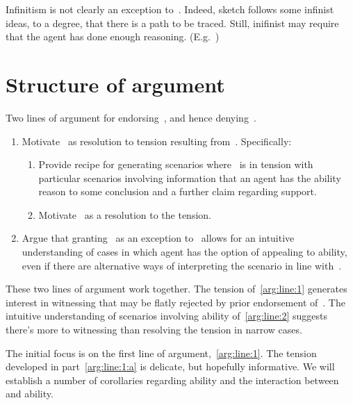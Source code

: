 \begin{note}
  Infinitism is not clearly an exception to~\uRa{}.
  Indeed, sketch follows some infinist ideas, to a degree, that there is a path to be traced.
  Still, inifinist may require that the agent has done enough reasoning.
  (E.g.\ \textcite[10]{Klein:2007ve})
\end{note}

\newpage

\section{Structure of argument}
\label{sec:structure-argument}

\begin{note}
  Two lines of argument for endorsing~\rC{}, and hence denying~\uRa{}.
  \begin{enumerate}[label=(L\arabic*), ref=(L\arabic*)]
  \item\label{arg:line:1} Motivate~\rC{} as resolution to tension resulting from~\uRa{}.\newline
    Specifically:
    \begin{enumerate}[label=(L1\alph*)]
    \item\label{arg:line:1:a} Provide recipe for generating scenarios where~\uRa{} is in tension with particular scenarios involving information that an agent has the ability reason to some conclusion and a further claim regarding support.
    \item\label{arg:line:1:b} Motivate~\rC{} as a resolution to the tension.
    \end{enumerate}
  \item\label{arg:line:2} Argue that granting~\rC{} as an exception to~\uRa{} allows for an intuitive understanding of cases in which agent has the option of appealing to ability, even if there are alternative ways of interpreting the scenario in line with~\uRa{}.
  \end{enumerate}
  These two lines of argument work together.
  The tension of~\ref{arg:line:1} generates interest in witnessing that may be flatly rejected by prior endorsement of~\uRa{}.
  The intuitive understanding of scenarios involving ability of~\ref{arg:line:2} suggests there's more to witnessing than resolving the tension in narrow cases.
\end{note}

\begin{note}
  The initial focus is on the first line of argument,~\ref{arg:line:1}.
  The tension developed in part~\ref{arg:line:1:a} is delicate, but hopefully informative.
  We will establish a number of corollaries regarding ability and the interaction between~\uRa{} and ability.
\end{note}

